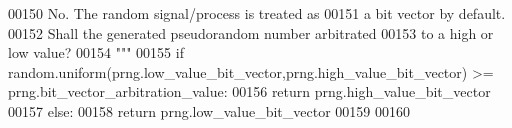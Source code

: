 \begin{DoxyCode}
00150 \textcolor{stringliteral}{                No. The random signal/process is treated as}
00151 \textcolor{stringliteral}{                    a bit vector by default.}
00152 \textcolor{stringliteral}{                Shall the generated pseudorandom number arbitrated}
00153 \textcolor{stringliteral}{                    to a high or low value?}
00154 \textcolor{stringliteral}{            """}
00155             \textcolor{keywordflow}{if} random.uniform(prng.low\_value\_bit\_vector,prng.high\_value\_bit\_vector) >= 
      prng.bit\_vector\_arbitration\_value:
00156                 \textcolor{keywordflow}{return} prng.high\_value\_bit\_vector
00157             \textcolor{keywordflow}{else}:
00158                 \textcolor{keywordflow}{return} prng.low\_value\_bit\_vector
00159 
00160 
\end{DoxyCode}
